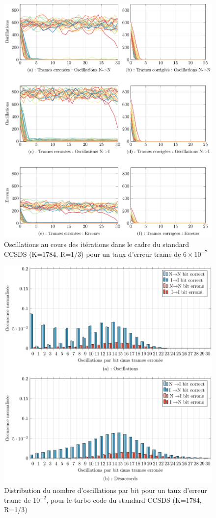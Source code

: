 \begin{figure}[!ht]
	\begin{center}
	\includegraphics[width=.9\textwidth]{main/ch2_fig/tikz/it_ccsds610-7.pdf}
	\caption{Oscillations au cours des itérations dans le cadre du standard CCSDS (K=1784, R=1/3) pour un taux d'erreur trame de $6\times10^{-7}$\label{fig:it2_ccsds}}
	\end{center}
\end{figure}

\begin{figure}[!ht]
	\centering
	\includegraphics[width=.9\textwidth]{main/ch2_fig/tikz/d_ccsds_10-2.pdf}
	\caption{Distribution du nombre d'oscillations par bit pour un taux d'erreur trame de $10^{-2}$, pour le turbo code du standard CCSDS (K=1784, R=1/3)\label{fig:d1_ccsds}}
\end{figure}


